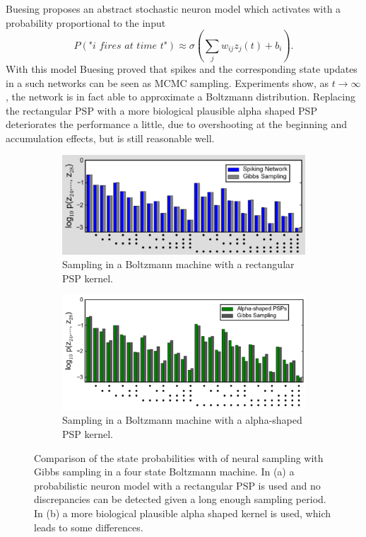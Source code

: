 Buesing proposes an abstract stochastic neuron model which activates with a probability proportional to the input
\[
P(\textit{"i fires at time t"}) \approx \sigma(\sum_j w_{ij} z_j(t) + b_i).
\]
With this model Buesing proved that spikes and the corresponding state updates in a such networks can be seen as MCMC sampling. Experiments show, as $t \rightarrow \infty$ , the network is in fact able to approximate a Boltzmann distribution.
Replacing the rectangular PSP with a more biological plausible alpha shaped PSP deteriorates the performance a little, due to overshooting at the beginning and accumulation effects, but is still reasonable well.

\begin{figure}
	\centering
	\begin{subfigure}[t]{.50\textwidth}
  		\centering
  		\includegraphics[width=.8\linewidth]{imgs/snn_sample3.png}
  		\caption{Sampling in a Boltzmann machine with a rectangular PSP kernel.}
  		\label{fig:sub1}
	\end{subfigure}%
	\begin{subfigure}[t]{.50\textwidth}
  		\centering
  		\includegraphics[width=.8\linewidth]{imgs/snn_sample4.png}
  		\caption{Sampling in a Boltzmann machine with a alpha-shaped PSP kernel. }
  		\label{fig:sub2}
	\end{subfigure}
	\caption{Comparison of the state probabilities with of neural sampling with Gibbs sampling in a four state Boltzmann machine. In (a) a probabilistic neuron model with a rectangular PSP is used and no discrepancies can be detected given a long enough sampling period. In (b) a more biological plausible alpha shaped kernel is used, which leads to some differences.}
	\label{fig:snnsamp3}
\end{figure}

